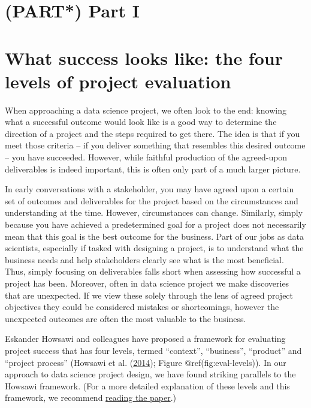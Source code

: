 \documentclass[
]{book}
\begin{document}
\hypertarget{part-part-i}{%
\chapter*{(PART*) Part I}\label{part-part-i}}

\hypertarget{levels}{%
\chapter{What success looks like: the four levels of project
evaluation}\label{levels}}

When approaching a data science project, we often look to the end:
knowing what a successful outcome would look like is a good way to
determine the direction of a project and the steps required to get
there. The idea is that if you meet those criteria -- if you deliver
something that resembles this desired outcome -- you have succeeded.
However, while faithful production of the agreed-upon deliverables is
indeed important, this is often only part of a much larger picture.

In early conversations with a stakeholder, you may have agreed upon a
certain set of outcomes and deliverables for the project based on the
circumstances and understanding at the time. However, circumstances can
change. Similarly, simply because you have achieved a predetermined goal
for a project does not necessarily mean that this goal is the best
outcome for the business. Part of our jobs as data scientists,
especially if tasked with designing a project, is to understand what the
business needs and help stakeholders clearly see what is the most
beneficial. Thus, simply focusing on deliverables falls short when
assessing how successful a project has been. Moreover, often in data
science project we make discoveries that are unexpected. If we view
these solely through the lens of agreed project objectives they could be
considered mistakes or shortcomings, however the unexpected outcomes are
often the most valuable to the business.

Eskander Howsawi and colleagues have proposed a framework for evaluating
project success that has four levels, termed ``context'', ``business'',
``product'' and ``project process'' (Howsawi et al.
(\protect\hyperlink{ref-Howsawi}{2014}); Figure @ref(fig:eval-levels)).
In our approach to data science project design, we have found striking
parallels to the Howsawi framework. (For a more detailed explanation of
these levels and this framework, we recommend
\href{https://doi.org/10.5130/.v1i0.3865}{reading the paper}.)
\end{document}
